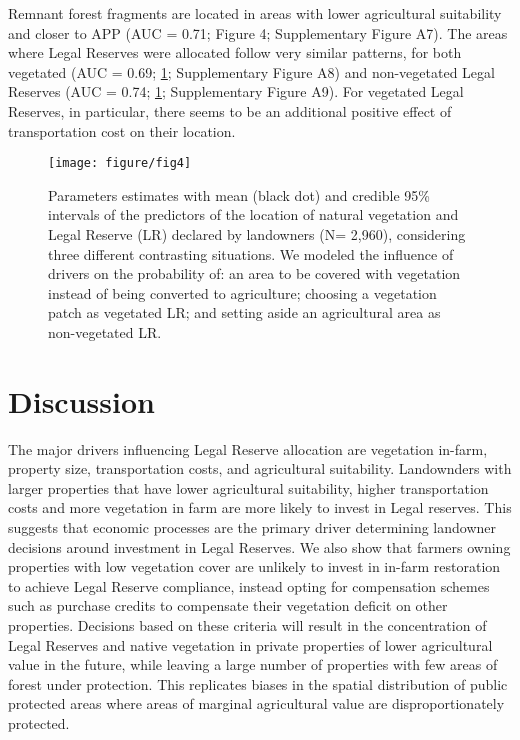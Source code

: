 \documentclass[
	12pt,				%
	oneside,			%
	a4paper,			%
	chapter=TITLE,		%
	section=TITLE,		%
	brazil,			%
	english				%
	]{abntex2}
\begin{document}
Remnant forest fragments are located in areas with lower agricultural suitability and closer to APP (AUC = 0.71; Figure 4; Supplementary Figure A7). The areas where Legal Reserves were allocated follow very similar patterns, for both vegetated (AUC = 0.69; \ref{fig:Figure4}; Supplementary Figure A8) and non-vegetated Legal Reserves (AUC = 0.74; \ref{fig:Figure4}; Supplementary Figure A9). For vegetated Legal Reserves, in particular, there seems to be an additional positive effect of transportation cost on their location.
\begin{figure}[H]

{\centering \texttt{[image: figure/fig4]} 

}

\caption{Parameters estimates with mean (black dot) and credible 95\% intervals of the predictors of the location of natural vegetation and Legal Reserve (LR) declared by landowners (N= 2,960), considering three different contrasting situations. We modeled the influence of drivers on the probability of: an area to be covered with vegetation instead of being converted to agriculture; choosing a vegetation patch as vegetated LR; and setting aside an agricultural area as non-vegetated LR.}\label{fig:Figure4}
\end{figure}
\hypertarget{discussion}{%
\section{Discussion}\label{discussion}}

The major drivers influencing Legal Reserve allocation are vegetation in-farm, property size, transportation costs, and agricultural suitability. Landownders with larger properties that have lower agricultural suitability, higher transportation costs and more vegetation in farm are more likely to invest in Legal reserves. This suggests that economic processes are the primary driver determining landowner decisions around investment in Legal Reserves. We also show that farmers owning properties with low vegetation cover are unlikely to invest in in-farm restoration to achieve Legal Reserve compliance, instead opting for compensation schemes such as purchase credits to compensate their vegetation deficit on other properties. Decisions based on these criteria will result in the concentration of Legal Reserves and native vegetation in private properties of lower agricultural value in the future, while leaving a large number of properties with few areas of forest under protection. This replicates biases in the spatial distribution of public protected areas \autocite{venter_bias_2018} where areas of marginal agricultural value are disproportionately protected.
\end{document}
